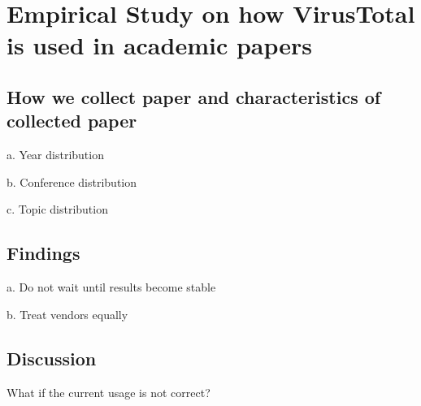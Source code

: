 \section{Empirical Study on how VirusTotal is used in academic papers}

\subsection{How we collect paper and characteristics of collected paper}

a. Year distribution

b. Conference distribution

c. Topic distribution 

\subsection{Findings}
a. Do not wait until results become stable

b. Treat vendors equally

\subsection{Discussion}
What if the current usage is not correct? 
